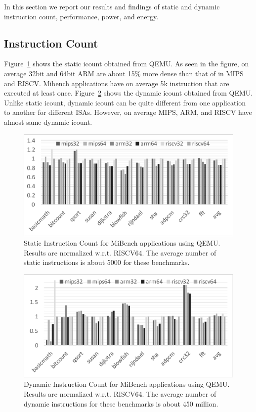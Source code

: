 In this section we report our results and findings of static and dynamic instruction count, performance, power, and energy. 

\subsection{Instruction Count}
Figure~\ref{fig:static} shows the static icount obtained from QEMU. As seen in the figure, on average 32bit and 64bit ARM are about 15\% more dense than that of in MIPS and RISCV. Mibench applications have on average 5k instruction that are executed at least once. Figure~\ref{fig:dynamic} shows the dynamic icount obtained from QEMU. Unlike static icount, dynamic icount can be quite different from one application to another for different ISAs. However, on average MIPS, ARM, and RISCV have almost same dynamic icount. 

\begin{figure}[t]
	\centering
	\includegraphics[width=1\columnwidth]{figures/static.pdf}
	\caption{Static Instruction Count for MiBench applications using QEMU. Results are normalized w.r.t. RISCV64. The average number of static instructions is about 5000 for these benchmarks.}
	\label{fig:static}
\end{figure} 

\begin{figure}[t]
	\centering
	\includegraphics[width=1\columnwidth]{figures/dynamic.pdf}
	\caption{Dynamic Instruction Count for MiBench applications using QEMU. Results are normalized w.r.t. RISCV64. The average number of dynamic instructions for these benchmarks is about 450 million.}
	\label{fig:dynamic}
\end{figure} 

